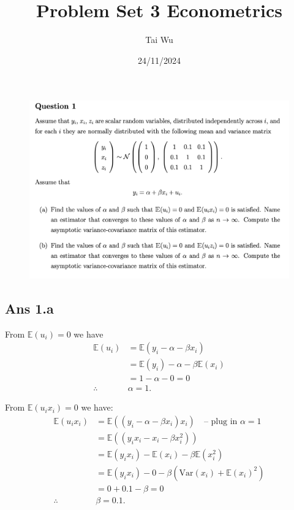 \documentclass{article}
\title{Problem Set 3 Econometrics}
\author{Tai Wu}
\date{24/11/2024}
\begin{document}
\maketitle

\section*{}

\begin{figure}[!htbp]
    \centering
    \includegraphics[width=1\linewidth]{question 1.png}
\end{figure}

\subsection*{Ans 1.a }
From \( \mathbb{E}(u_i)  = 0\) we have
\begin{align*}
\mathbb{E}(u_i) &= \mathbb{E}(y_i - \alpha - \beta x_i) \\
                &= \mathbb{E}(y_i) - \alpha - \beta \mathbb{E}(x_i) \\
                &= 1 - \alpha - 0 = 0 \\
\therefore \quad &\alpha = 1.
\end{align*}

From \( \mathbb{E}(u_i x_i) =0\) we have:
\begin{align*}
\mathbb{E}(u_i x_i) &= \mathbb{E}((y_i - \alpha - \beta x_i) x_i) \quad \text{-- plug in } \alpha = 1 \\
                    &= \mathbb{E}((y_i x_i - x_i - \beta x_i^2)) \\
                    &= \mathbb{E}(y_i x_i) - \mathbb{E}(x_i) - \beta \mathbb{E}(x_i^2) \\
                    &= \mathbb{E}(y_i x_i) - 0 - \beta (\text{Var}(x_i) + \mathbb{E}(x_i)^2) \\
                    &= 0 + 0.1 - \beta = 0 \\
\therefore \quad &\beta = 0.1.
\end{align*}
\end{document}
